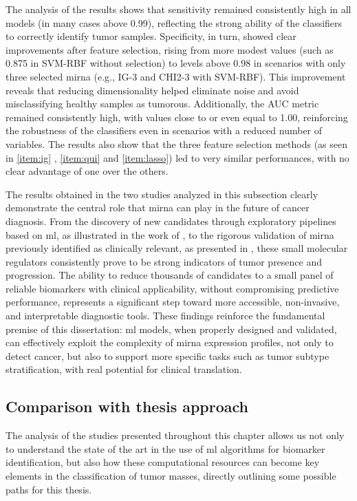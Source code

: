 The analysis of the results shows that sensitivity remained consistently high
in all models (in many cases above 0.99), reflecting the strong ability of the
classifiers to correctly identify tumor samples. Specificity, in turn, showed
clear improvements after feature selection, rising from more modest values
(such as 0.875 in SVM-RBF without selection) to levels above 0.98 in scenarios
with only three selected \gls{mirna} (e.g., IG-3 and CHI2-3 with SVM-RBF). This
improvement reveals that reducing dimensionality helped eliminate noise and
avoid misclassifying healthy samples as tumorous. Additionally, the AUC metric
remained consistently high, with values close to or even equal to 1.00,
reinforcing the robustness of the classifiers even in scenarios with a reduced
number of variables. The results also show that the three feature selection
methods (as seen in \ref{item:ig} , \ref{item:qui} and \ref{item:lasso}) led to
very similar performances, with no clear advantage of one over the others.

The results obtained in the two studies analyzed in this subsection clearly
demonstrate the central role that \gls{mirna} can play in the future of cancer
diagnosis. From the discovery of new candidates through exploratory pipelines
based on \gls{ml}, as illustrated in the work of
\textcite{ml_gastric_Azari2023}, to the rigorous validation of \gls{mirna}
previously identified as clinically relevant, as presented in
\textcite{val_of_mirna_as_biomarker_Rehman_2019}, these small molecular
regulators consistently prove to be strong indicators of tumor presence and
progression. The ability to reduce thousands of candidates to a small panel of
reliable biomarkers with clinical applicability, without compromising
predictive performance, represents a significant step toward more accessible,
non-invasive, and interpretable diagnostic tools. These findings reinforce the
fundamental premise of this dissertation: \gls{ml} models, when properly
designed and validated, can effectively exploit the complexity of \gls{mirna}
expression profiles, not only to detect cancer, but also to support more
specific tasks such as tumor subtype stratification, with real potential for
clinical translation.

\subsection{Comparison with thesis approach}

The analysis of the studies presented throughout this chapter allows us not
only to understand the state of the art in the use of \gls{ml} algorithms for
biomarker identification, but also how these computational resources can become
key elements in the classification of tumor masses, directly outlining some
possible paths for this thesis.

